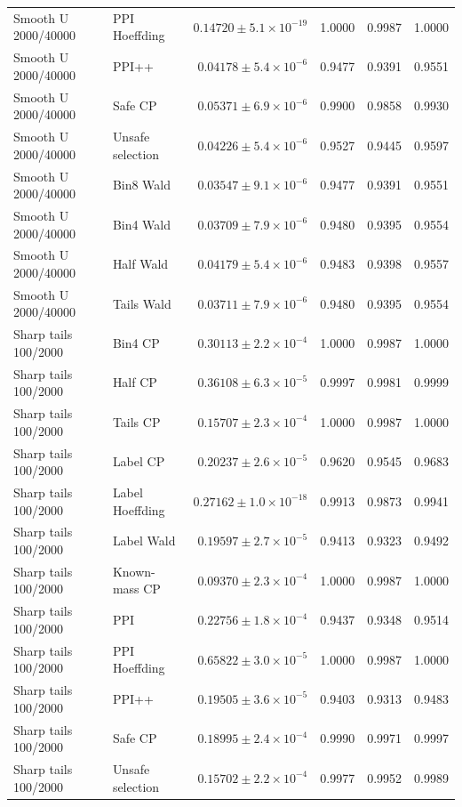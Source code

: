 \begin{longtable}{llrrrr}
Smooth U 2000/40000 & PPI Hoeffding & $0.14720\pm 5.1\times 10^{-19}$ & 1.0000 & 0.9987 & 1.0000 \\
Smooth U 2000/40000 & PPI++ & $0.04178\pm 5.4\times 10^{-6}$ & 0.9477 & 0.9391 & 0.9551 \\
Smooth U 2000/40000 & Safe CP & $0.05371\pm 6.9\times 10^{-6}$ & 0.9900 & 0.9858 & 0.9930 \\
Smooth U 2000/40000 & Unsafe selection & $0.04226\pm 5.4\times 10^{-6}$ & 0.9527 & 0.9445 & 0.9597 \\
Smooth U 2000/40000 & Bin8 Wald & $0.03547\pm 9.1\times 10^{-6}$ & 0.9477 & 0.9391 & 0.9551 \\
Smooth U 2000/40000 & Bin4 Wald & $0.03709\pm 7.9\times 10^{-6}$ & 0.9480 & 0.9395 & 0.9554 \\
Smooth U 2000/40000 & Half Wald & $0.04179\pm 5.4\times 10^{-6}$ & 0.9483 & 0.9398 & 0.9557 \\
Smooth U 2000/40000 & Tails Wald & $0.03711\pm 7.9\times 10^{-6}$ & 0.9480 & 0.9395 & 0.9554 \\
Sharp tails 100/2000 & Bin4 CP & $0.30113\pm 2.2\times 10^{-4}$ & 1.0000 & 0.9987 & 1.0000 \\
Sharp tails 100/2000 & Half CP & $0.36108\pm 6.3\times 10^{-5}$ & 0.9997 & 0.9981 & 0.9999 \\
Sharp tails 100/2000 & Tails CP & $0.15707\pm 2.3\times 10^{-4}$ & 1.0000 & 0.9987 & 1.0000 \\
Sharp tails 100/2000 & Label CP & $0.20237\pm 2.6\times 10^{-5}$ & 0.9620 & 0.9545 & 0.9683 \\
Sharp tails 100/2000 & Label Hoeffding & $0.27162\pm 1.0\times 10^{-18}$ & 0.9913 & 0.9873 & 0.9941 \\
Sharp tails 100/2000 & Label Wald & $0.19597\pm 2.7\times 10^{-5}$ & 0.9413 & 0.9323 & 0.9492 \\
Sharp tails 100/2000 & Known-mass CP & $0.09370\pm 2.3\times 10^{-4}$ & 1.0000 & 0.9987 & 1.0000 \\
Sharp tails 100/2000 & PPI & $0.22756\pm 1.8\times 10^{-4}$ & 0.9437 & 0.9348 & 0.9514 \\
Sharp tails 100/2000 & PPI Hoeffding & $0.65822\pm 3.0\times 10^{-5}$ & 1.0000 & 0.9987 & 1.0000 \\
Sharp tails 100/2000 & PPI++ & $0.19505\pm 3.6\times 10^{-5}$ & 0.9403 & 0.9313 & 0.9483 \\
Sharp tails 100/2000 & Safe CP & $0.18995\pm 2.4\times 10^{-4}$ & 0.9990 & 0.9971 & 0.9997 \\
Sharp tails 100/2000 & Unsafe selection & $0.15702\pm 2.2\times 10^{-4}$ & 0.9977 & 0.9952 & 0.9989 \\

\end{longtable}
